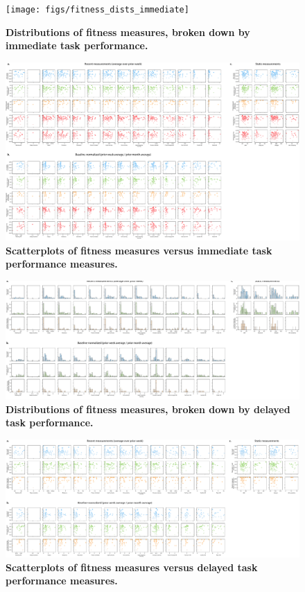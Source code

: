 \documentclass[10pt]{article}
\begin{document}
\begin{figure}
\centering
\texttt{[image: figs/fitness\_dists\_immediate]}
\caption{\textbf{Distributions of fitness measures, broken down
    by immediate task performance.}}
\label{fig:fitness_dists_immediate}
\end{figure}

\begin{figure}
\centering
\includegraphics[width=\textwidth]{figs/fitness_scatter_immediate}
\caption{\textbf{Scatterplots of fitness measures versus
    immediate task performance measures.}}
\label{fig:fitness_scatters_immediate}
\end{figure}

\begin{figure}
\centering
\includegraphics[width=\textwidth]{figs/fitness_dists_delayed}
\caption{\textbf{Distributions of fitness measures, broken down
    by delayed task performance.}}
\label{fig:fitness_dists_delayed}
\end{figure}

\begin{figure}
\centering
\includegraphics[width=\textwidth]{figs/fitness_scatter_delayed}
\caption{\textbf{Scatterplots of fitness measures versus
    delayed task performance measures.}}
\label{fig:fitness_scatters_delayed}
\end{figure}
\end{document}
